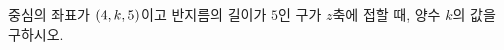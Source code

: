 중심의 좌표가 $(4{,}\mkern3mu\mathopen{}k{,}\mkern3mu\mathopen{}5)$이고 반지름의 길이가 $5$인 구가 $z$축에 접할 때, 양수 $k$의 값을 구하시오.
